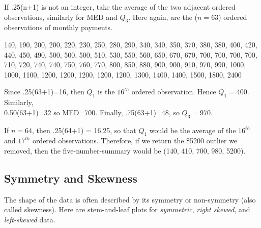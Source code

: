 \documentclass[11pt]{book}\usepackage[]{graphicx}\usepackage[]{color}
\begin{document}
If .25(n+1) is not an integer, take the average of the two adjacent ordered observations, similarly for MED and $Q_3$.  Here again, are the ($n = 63$) ordered observations of monthly payments.

{\small{
140, 190, 200, 200, 220, 230, 250, 280, 290, 340, 340, 350, 370, 380, 380, 400, 420, 440, 450, 490, 500, 500, 500, 510, 530, 550, 560, 650, 670, 670, 700, 700, 700, 700, 710, 720, 740, 740, 750, 760, 770, 800, 850, 880, 900, 900, 910, 970, 990, 1000, 1000, 1100, 1200, 1200, 1200, 1200, 1200, 1300, 1400, 1400, 1500, 1800, 2400
}}


Since .25(63+1)=16, then $Q_1$ is the $16^{th}$ ordered observation.  Hence $Q_1 = 400$.  Similarly, \\ 0.50(63+1)=32 so MED=700.  Finally, .75(63+1)=48, so $Q_3 = 970$.

If $n = 64$, then .25(64+1) = 16.25, so that $Q_1$ would be the average of the $16^{th}$ and $17^{th}$ ordered observations.  Therefore, if we return the \$5200 outlier we removed, then the five-number-summary would be (140, 410, 700, 980, 5200).

\subsection{Symmetry and Skewness}   

The shape of the data is often described by its symmetry or non-symmetry (also called skewness).  Here are stem-and-leaf plots for \textit{symmetric}, \textit{right skewed}, and \textit{left-skewed} data.

\vspace{3mm}
\end{document}
